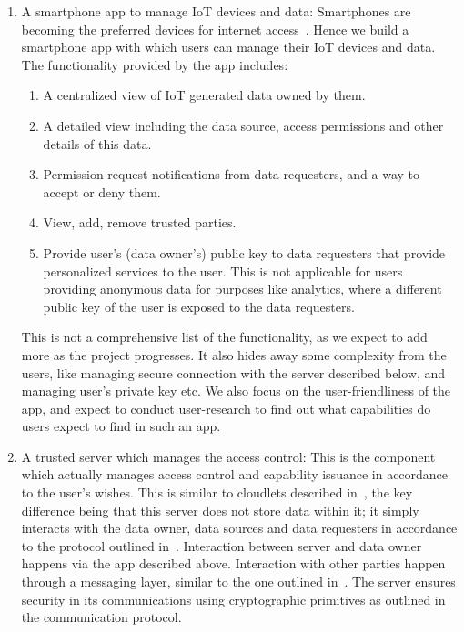 \begin{enumerate}
	\item A smartphone app to manage IoT devices and data: Smartphones are becoming the preferred devices for internet access~\cite{statcount}. Hence we build a smartphone app with which users can manage their IoT devices and data. The functionality provided by the app includes:

	\begin{enumerate}
		\item A centralized view of IoT generated data owned by them.

		\item A detailed view including the data source, access permissions and other details of this data.

		\item Permission request notifications from data requesters, and a way to accept or deny them.

		\item View, add, remove trusted parties.

		\item Provide user's (data owner's) public key to data requesters that provide personalized services to the user. This is not applicable for users providing anonymous data for purposes like analytics, where a different public key of the user is exposed to the data requesters.

	\end{enumerate}

	This is not a comprehensive list of the functionality, as we expect to add more as the project progresses. It also hides away some complexity from the users, like managing secure connection with the server described below, and managing user's private key etc. We also focus on the user-friendliness of the app, and expect to conduct user-research to find out what capabilities do users expect to find in such an app.
	
	\item A trusted server which manages the access control: This is the component which actually manages access control and capability issuance in accordance to the user's wishes. This is similar to cloudlets described in~\cite{davies}, the key difference being that this server does not store data within it; it simply interacts with the data owner, data sources and data requesters in accordance to the protocol outlined in~\cite{campbell}. Interaction between server and data owner happens via the app described above. Interaction with other parties happen through a messaging layer, similar to the one outlined in~\cite{campbell}. The server ensures security in its communications using cryptographic primitives as outlined in the communication protocol.


\end{enumerate}
